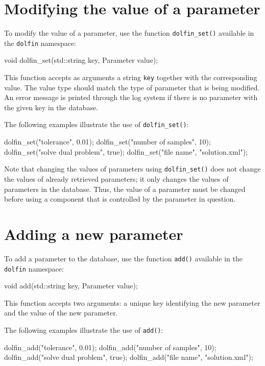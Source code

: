 \section{Modifying the value of a parameter}

To modify the value of a parameter, use the function \texttt{dolfin\_set()}
available in the \texttt{dolfin} namespace:
\begin{code}
void dolfin_set(std::string key, Parameter value);
\end{code}
This function accepts as arguments a string \texttt{key} together with
the corresponding value. The value type should match the type of
parameter that is being modified. An error message is
printed through the log system if there is no parameter with the given
key in the database.

The following examples illustrate
the use of \texttt{dolfin\_set()}:
\begin{code}
dolfin_set("tolerance", 0.01);
dolfin_set("number of samples", 10);
dolfin_set("solve dual problem", true);
dolfin_set("file name", "solution.xml");
\end{code}

Note that changing the values of parameters using
\texttt{dolfin\_set()} does not change the values of already retrieved
parameters; it only changes the values of parameters in the
database. Thus, the value of a parameter must be changed before using
a component that is controlled by the parameter in question.

\section{Adding a new parameter}

To add a parameter to the database, use the function
\texttt{add()} available in the \texttt{dolfin}
namespace:
\begin{code}
void add(std::string key, Parameter value);
\end{code}
This function accepts two arguments:
a unique key identifying the new parameter and the value of the new
parameter.

The following examples illustrate the use of
\texttt{add()}:
\begin{code}
dolfin_add("tolerance", 0.01);
dolfin_add("number of samples", 10);
dolfin_add("solve dual problem", true);
dolfin_add("file name", "solution.xml");
\end{code}

